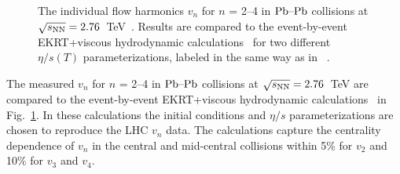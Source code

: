 \begin{figure}[h]
\begin{center}
        \caption{The individual flow harmonics $v_n$ for $n$ = 2--4 in $\textnormal{Pb--Pb}$ collisions at $\sqrt{s_{\textnormal{NN}}}=2.76$~TeV~\cite{Adam:2016izf}. Results are compared to the event-by-event EKRT+viscous hydrodynamic calculations~\cite{Niemi:2015qia} for two different $\eta/s(T)$ parameterizations, labeled in the same way as in ~\cite{Niemi:2015qia}.}
        \label{fig:Figure_A1}
              \end{center}
\end{figure}

The measured $v_n$ for $n$ = 2--4 in $\textnormal{Pb--Pb}$ collisions at $\sqrt{s_{\textnormal{NN}}}=2.76$~TeV are compared to the event-by-event EKRT+viscous hydrodynamic calculations~\cite{Niemi:2015qia} in Fig.~\ref{fig:Figure_A1}. In these calculations the initial conditions and $\eta/s$ parameterizations are chosen to reproduce the LHC $v_n$ data.
The calculations capture the centrality dependence of $v_n$ in the central and mid-central collisions within 5\% for $v_2$ and 10\% for $v_3$ and $v_4$.

